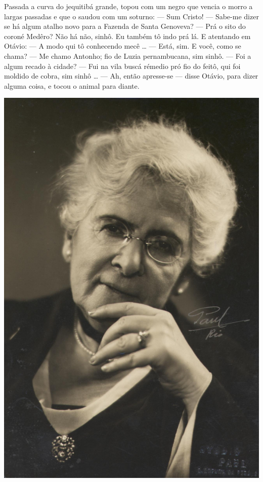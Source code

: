 \begin{myquote}


\begin{minipage}{0.55\textwidth}
Passada a curva do jequitibá grande, topou com um negro
que vencia o morro a largas passadas e que o saudou com um
soturno:
--- Sum Cristo!
--- Sabe-me dizer se há algum atalho novo para a Fazenda de
Santa Genoveva?
--- Prá o sito do coroné Medêro? Não há não, sinhô. Eu
também tô indo prá lá.
E atentando em Otávio:
--- A modo qui tô conhecendo mecê \ldots{}
--- Está, sim. E você, como se chama?
--- Me chamo Antonho; fio de Luzia pernambucana, sim sinhô.
--- Foi a algum recado à cidade?
--- Fui na vila buscá rémedio pró fio do feitô, qui foi moldido
de cobra, sim sinhô \ldots{}
--- Ah, então apresse-se --- disse Otávio, para dizer alguma
coisa, e tocou o animal para diante.
\end{minipage}
\hfill
\begin{minipage}{0.4\textwidth}
  \centering
  \includegraphics[width=\textwidth]{./imgSAEB_7_POR/media/image60.png}
\end{minipage} 


\end{myquote}
